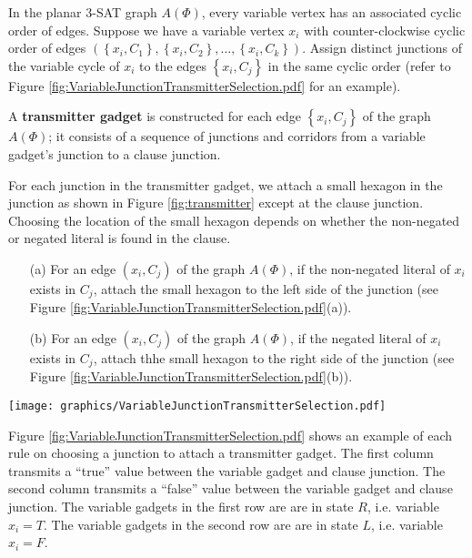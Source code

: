 \documentclass[10pt]{CSUNthesis}
\theoremstyle{plain}%
\theoremstyle{definition}
\theoremstyle{remark}
\newcommand{\lr}[1]{\left( #1 \right)}
\begin{document}
In the planar 3-SAT graph $A(\Phi)$, every variable vertex has an associated cyclic order of edges.
Suppose we have a variable vertex $x_i$ with counter-clockwise cyclic order of edges $\lr{\left\lbrace x_i,C_1\right\rbrace,\left\lbrace x_i,C_2\right\rbrace, \dots, \left\lbrace x_i,C_k\right\rbrace }$.
Assign distinct junctions of the variable cycle of $x_i$ to the edges $\left\lbrace x_i,C_j\right\rbrace$ in the same cyclic order (refer to Figure \ref{fig:VariableJunctionTransmitterSelection.pdf} for an example).

 A {\bf transmitter gadget} is constructed for each edge $\left\lbrace x_i,C_j\right\rbrace$ of the graph $A(\Phi)$; it consists of a sequence of junctions and corridors from a variable gadget's junction to a clause junction.

For each junction in the transmitter gadget, we attach a small hexagon in the junction as shown in Figure \ref{fig:transmitter} except at the clause junction.
Choosing the location of the small hexagon depends on whether the non-negated or negated literal is found in the clause.
\begin{itemize}
\item[(a)]  For an edge $(x_i,C_j)$ of the graph $A(\Phi)$, if the non-negated literal of $x_i$ exists in $C_j$, attach the small hexagon to the left side of the junction (see Figure \ref{fig:VariableJunctionTransmitterSelection.pdf}(a)).
\item[(b)]  For an edge $(x_i,C_j)$ of the graph $A(\Phi)$, if the negated literal of $x_i$ exists in $C_j$, attach thhe small hexagon to the right side of the junction (see Figure \ref{fig:VariableJunctionTransmitterSelection.pdf}(b)).
\end{itemize}

\begin{minipage}{\linewidth}
\begin{center}
\texttt{[image: graphics/VariableJunctionTransmitterSelection.pdf]}
\label{fig:VariableJunctionTransmitterSelection.pdf}
\end{center}
\end{minipage} 

Figure \ref{fig:VariableJunctionTransmitterSelection.pdf} shows an example of each rule on choosing a junction to attach a transmitter gadget.
The first column transmits a ``true'' value between the variable gadget and clause junction.
The second column transmits a ``false'' value between the variable gadget and clause junction.
The variable gadgets in the first row are are in state $R$, i.e. variable $x_i = T$.
The variable gadgets in the second row are are in state $L$, i.e. variable $x_i = F$.
\end{document}
